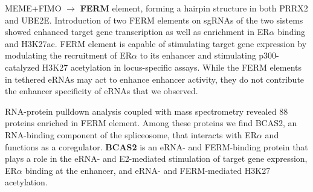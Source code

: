MEME+FIMO  $\rightarrow$  \textbf{FERM} element, forming a hairpin structure in both PRRX2 and UBE2E. Introduction of two FERM elements on
sgRNAs of the two sistems showed enhanced target gene transcription as well as enrichment in ER$\alpha$ binding and H3K27ac.
FERM element is capable of stimulating target gene expression by
modulating the recruitment of ER$\alpha$ to its enhancer and stimulating
p300- catalyzed H3K27 acetylation in locus-specific assays.
While the FERM elements in tethered eRNAs may act to enhance
enhancer activity, they do not contribute the enhancer specificity of
eRNAs that we observed.

RNA-protein pulldown analysis coupled with mass spectrometry revealed 88 proteins enriched in
FERM element. Among these proteins we find BCAS2, an RNA-binding component of the spliceosome, that
interacts with ER$\alpha$ and functions as a coregulator. \textbf{BCAS2} is an eRNA- and FERM-binding protein that plays a role in the eRNA- and
E2-mediated stimulation of target gene expression, ER$\alpha$ binding at the
enhancer, and eRNA- and FERM-mediated H3K27 acetylation.  

